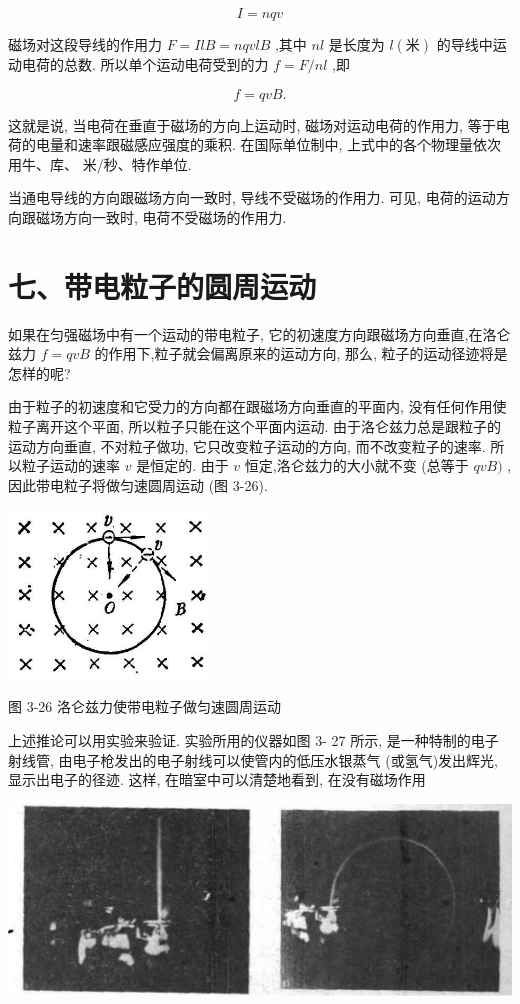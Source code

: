 \documentclass[10pt]{article}
\begin{document}
\[
I = {nqv}
\]

磁场对这段导线的作用力 \(F = {IlB} = {nqvlB}\) ,其中 \({nl}\) 是长度为 \(l\left( \text{米}\right)\) 的导线中运动电荷的总数. 所以单个运动电荷受到的力 \(f = F/{nl}\) ,即

\[
f = {qvB}\text{.}
\]

这就是说, 当电荷在垂直于磁场的方向上运动时, 磁场对运动电荷的作用力, 等于电荷的电量和速率跟磁感应强度的乘积. 在国际单位制中, 上式中的各个物理量依次用牛、库、 米/秒、特作单位.

当通电导线的方向跟磁场方向一致时, 导线不受磁场的作用力. 可见, 电荷的运动方向跟磁场方向一致时, 电荷不受磁场的作用力.

\section*{七、带电粒子的圆周运动}

如果在匀强磁场中有一个运动的带电粒子, 它的初速度方向跟磁场方向垂直,在洛仑兹力 \(f = {qvB}\) 的作用下,粒子就会偏离原来的运动方向, 那么, 粒子的运动径迹将是怎样的呢?

由于粒子的初速度和它受力的方向都在跟磁场方向垂直的平面内, 没有任何作用使粒子离开这个平面, 所以粒子只能在这个平面内运动. 由于洛仑兹力总是跟粒子的运动方向垂直, 不对粒子做功, 它只改变粒子运动的方向, 而不改变粒子的速率. 所以粒子运动的速率 \(v\) 是恒定的. 由于 \(v\) 恒定,洛仑兹力的大小就不变 (总等于 \({qvB})\) ,因此带电粒子将做匀速圆周运动 (图 3-26).

\begin{center}
\includegraphics[max width=0.4\textwidth]{images/01913056-1f15-74d8-9184-9aab52c9d66b_120_110463.jpg}
\end{center}

图 3-26 洛仑兹力使带电粒子做匀速圆周运动

上述推论可以用实验来验证. 实验所用的仪器如图 3- 27 所示, 是一种特制的电子射线管, 由电子枪发出的电子射线可以使管内的低压水银蒸气 (或氢气)发出辉光, 显示出电子的径迹. 这样, 在暗室中可以清楚地看到, 在没有磁场作用

\begin{center}
\includegraphics[max width=1.0\textwidth]{images/01913056-1f15-74d8-9184-9aab52c9d66b_121_202317.jpg}
\end{center}
\end{document}

